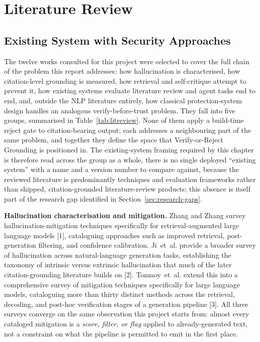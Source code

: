 \documentclass[12pt,a4paper]{report}
\begin{document}
\chapter{Literature Review}
\label{ch:litreview}

\section{Existing System with Security Approaches}
The twelve works consulted for this project were selected to cover the full
chain of the problem this report addresses: how hallucination is
characterised, how citation-level grounding is measured, how retrieval and
self-critique attempt to prevent it, how existing systems evaluate literature
review and agent tasks end to end, and, outside the NLP literature entirely,
how classical protection-system design handles an analogous
verify-before-trust problem. They fall into five groups, summarised in
Table~\ref{tab:litreview}. None of them apply a build-time reject gate to
citation-bearing output; each addresses a neighbouring part of the same
problem, and together they define the space that Verify-or-Reject Grounding is
positioned in. The existing-system framing required by this chapter is
therefore read across the group as a whole, there is no single deployed
``existing system'' with a name and a version number to compare against,
because the reviewed literature is predominantly techniques and evaluation
frameworks rather than shipped, citation-grounded literature-review products;
this absence is itself part of the research gap identified in
Section~\ref{sec:research-gaps}.

\textbf{Hallucination characterisation and mitigation.} Zhang and Zhang survey
hallucination-mitigation techniques specifically for retrieval-augmented large
language models [1], cataloguing approaches such
as improved retrieval, post-generation filtering, and confidence calibration.
Ji~et~al. provide a broader survey of hallucination across natural-language
generation tasks, establishing the taxonomy of intrinsic versus extrinsic
hallucination that much of the later citation-grounding literature builds on
[2]. Tonmoy~et~al. extend this into a comprehensive survey
of mitigation techniques specifically for large language models, cataloguing
more than thirty distinct methods across the retrieval, decoding, and post-hoc
verification stages of a generation pipeline [3].
All three surveys converge on the same observation this project starts from:
almost every cataloged mitigation is a \emph{score, filter, or flag} applied to
already-generated text, not a constraint on what the pipeline is permitted to
emit in the first place.
\end{document}
